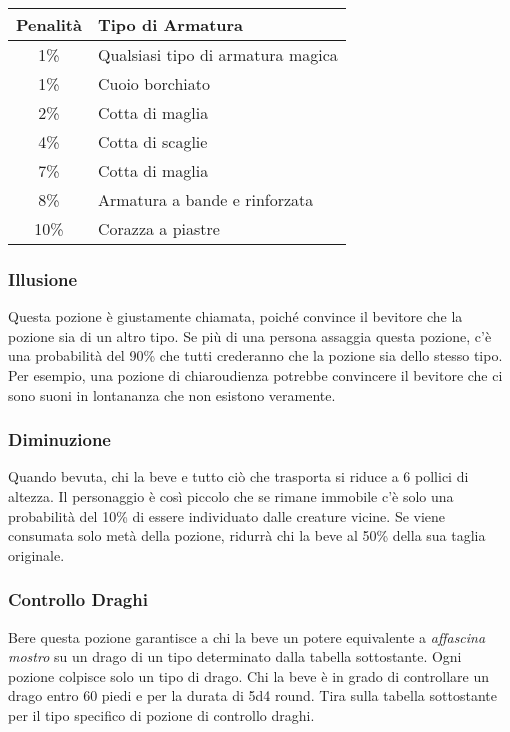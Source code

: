 \documentclass{article}
\begin{document}
\begin{multicols}{2}
\begin{table}[h]
\centering
\begin{tabular}{|c|l|}
\hline
\textbf{Penalità} & \textbf{Tipo di Armatura} \\
\hline
1\% & Qualsiasi tipo di armatura magica \\
1\% & Cuoio borchiato \\
2\% & Cotta di maglia \\
4\% & Cotta di scaglie \\
7\% & Cotta di maglia \\
8\% & Armatura a bande e rinforzata \\
10\% & Corazza a piastre \\
\hline
\end{tabular}

\end{table}

\subsubsection{Illusione}
Questa pozione è giustamente chiamata, poiché convince il bevitore che la pozione sia di un altro tipo. Se più di una persona assaggia questa pozione, c'è una probabilità del 90\% che tutti crederanno che la pozione sia dello stesso tipo. Per esempio, una pozione di chiaroudienza potrebbe convincere il bevitore che ci sono suoni in lontananza che non esistono veramente.

\subsubsection{Diminuzione}
Quando bevuta, chi la beve e tutto ciò che trasporta si riduce a 6 pollici di altezza. Il personaggio è così piccolo che se rimane immobile c'è solo una probabilità del 10\% di essere individuato dalle creature vicine. Se viene consumata solo metà della pozione, ridurrà chi la beve al 50\% della sua taglia originale.

\subsubsection{Controllo Draghi}
Bere questa pozione garantisce a chi la beve un potere equivalente a \textit{affascina mostro} su un drago di un tipo determinato dalla tabella sottostante. Ogni pozione colpisce solo un tipo di drago. Chi la beve è in grado di controllare un drago entro 60 piedi e per la durata di 5d4 round. Tira sulla tabella sottostante per il tipo specifico di pozione di controllo draghi.


\end{multicols}
\end{document}

